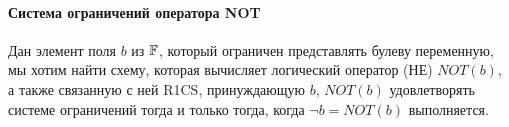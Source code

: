 \begin{exercise}

\end{exercise}
\paragraph{Система ограничений оператора NOT} Дан элемент поля $b$ из $\mathbb{F}$, который ограничен представлять булеву переменную, мы хотим найти схему, которая вычисляет логический оператор  (НЕ) $NOT(b)$, а также связанную с ней R1CS, принуждающую $b$, $NOT(b)$ удовлетворять системе ограничений тогда и только тогда, когда $\lnot b = NOT(b)$ выполняется.

